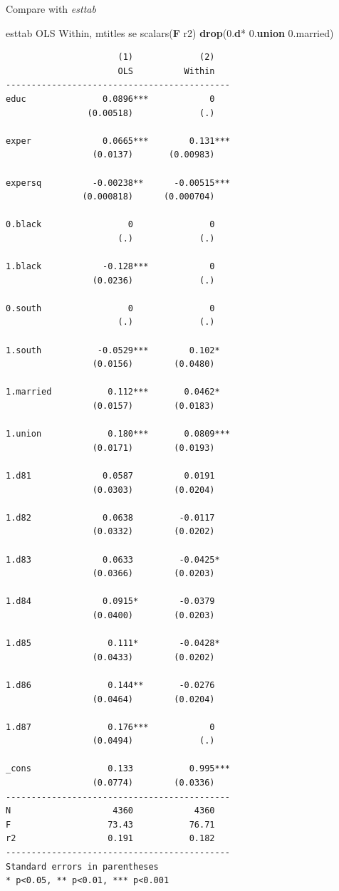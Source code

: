 \documentclass[
]{book}
\newenvironment{Shaded}{\begin{snugshade}}{\end{snugshade}}
\newcommand{\FunctionTok}[1]{\textcolor[rgb]{0.13,0.29,0.53}{\textbf{#1}}}
\newcommand{\KeywordTok}[1]{\textcolor[rgb]{0.13,0.29,0.53}{\textbf{#1}}}
\newcommand{\NormalTok}[1]{#1}
\begin{document}
Compare with \emph{esttab}

\begin{Shaded}
\begin{Highlighting}[]
\NormalTok{esttab OLS Within, mtitles se scalars(}\FunctionTok{F}\NormalTok{ r2) }\KeywordTok{drop}\NormalTok{(0.}\KeywordTok{d}\NormalTok{* 0.}\KeywordTok{union}\NormalTok{ 0.married)}
\end{Highlighting}
\end{Shaded}

\begin{verbatim}
                      (1)             (2)   
                      OLS          Within   
--------------------------------------------
educ               0.0896***            0   
                (0.00518)             (.)   

exper              0.0665***        0.131***
                 (0.0137)       (0.00983)   

expersq          -0.00238**      -0.00515***
               (0.000818)      (0.000704)   

0.black                 0               0   
                      (.)             (.)   

1.black            -0.128***            0   
                 (0.0236)             (.)   

0.south                 0               0   
                      (.)             (.)   

1.south           -0.0529***        0.102*  
                 (0.0156)        (0.0480)   

1.married           0.112***       0.0462*  
                 (0.0157)        (0.0183)   

1.union             0.180***       0.0809***
                 (0.0171)        (0.0193)   

1.d81              0.0587          0.0191   
                 (0.0303)        (0.0204)   

1.d82              0.0638         -0.0117   
                 (0.0332)        (0.0202)   

1.d83              0.0633         -0.0425*  
                 (0.0366)        (0.0203)   

1.d84              0.0915*        -0.0379   
                 (0.0400)        (0.0203)   

1.d85               0.111*        -0.0428*  
                 (0.0433)        (0.0202)   

1.d86               0.144**       -0.0276   
                 (0.0464)        (0.0204)   

1.d87               0.176***            0   
                 (0.0494)             (.)   

_cons               0.133           0.995***
                 (0.0774)        (0.0336)   
--------------------------------------------
N                    4360            4360   
F                   73.43           76.71   
r2                  0.191           0.182   
--------------------------------------------
Standard errors in parentheses
* p<0.05, ** p<0.01, *** p<0.001
\end{verbatim}
\end{document}
